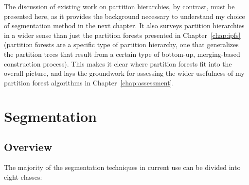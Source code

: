 The discussion of existing work on partition hierarchies, by contrast, must be presented here, as it provides the background necessary to understand my choice of segmentation method in the next chapter. It also surveys partition hierarchies in a wider sense than just the partition forests presented in Chapter~\ref{chap:ipfs} (partition forests are a specific type of partition hierarchy, one that generalizes the partition trees that result from a certain type of bottom-up, merging-based construction process). This makes it clear where partition forests fit into the overall picture, and lays the groundwork for assessing the wider usefulness of my partition forest algorithms in Chapter~\ref{chap:assessment}.

\newpage

\section{Segmentation}

\subsection{Overview}

The majority of the segmentation techniques in current use can be divided into eight classes:

